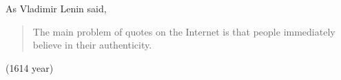 \documentclass{article}
\begin{document}
\noindent 
As Vladimir Lenin said, 
\begin{quote}
     The main problem of quotes on the Internet is that people immediately believe in their authenticity.
\end{quote}
(1614 year)
\end{document}
